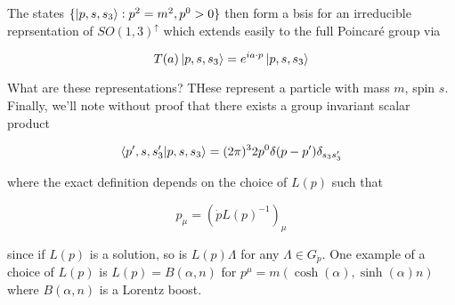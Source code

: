 \documentclass{article}
\theoremstyle{definition}
\begin{document}
The states $\{\ket{p, s, s_3} : p^2 = m^2, p^0 > 0\}$ then form a bsis for an
irreducible reprsentation of $SO(1, 3)^\uparrow$ which extends easily to the
full Poincar\'{e} group via

$$ T(a) \ket{p, s, s_3} = e^{i a \cdot p} \ket{p, s, s_3} $$

What are these representations? THese represent a particle with mass $m$, spin
$s$. Finally, we'll note without proof that there exists a group invariant
scalar product

$$ \bra{p', s, s'_3} \ket{p, s, s_3} = (2\pi)^3 2p^0 \delta(p - p') \delta_{s_3
  s'_3} $$

where the exact definition depends on the choice of $L(p)$ such that

$$ p_\mu = (\dot{p} L(p)^{-1})_\mu $$

since if $L(p)$ is a solution, so is $L(p) \Lambda$ for any $\Lambda \in
G_{\dot{p}}$. One example of a choice of $L(p)$ is $L(p) = B(\alpha, n)$ for
$p^\mu = m(\cosh(\alpha), \sinh(\alpha) n)$ where $B(\alpha, n)$ is a Lorentz
boost. 
\end{document}
